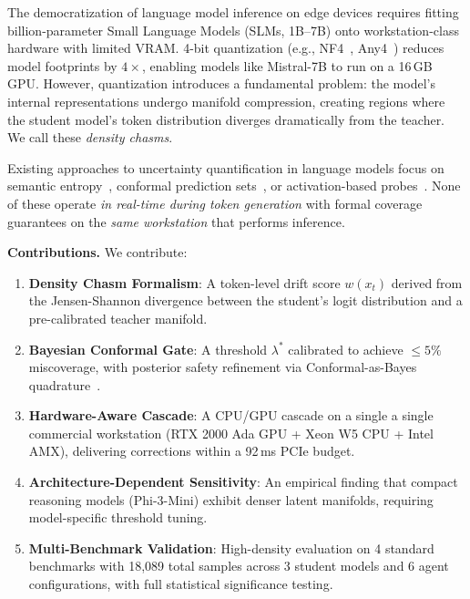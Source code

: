 \documentclass{uai2026}  %
\begin{document}
The democratization of language model inference on edge devices requires fitting
billion-parameter Small Language Models (SLMs, 1B--7B) onto workstation-class hardware with limited VRAM.
4-bit quantization (e.g., NF4~\cite{dettmers2023qlora},
Any4~\cite{dettmers2024any4}) reduces model footprints by $4\times$,
enabling models like Mistral-7B to run on a 16\,GB GPU.
However, quantization introduces a fundamental problem:
the model's internal representations undergo manifold compression,
creating regions where the student model's token distribution diverges
dramatically from the teacher. We call these \emph{density chasms}.

Existing approaches to uncertainty quantification in language models focus on
semantic entropy~\cite{kuhn2023semantic}, conformal prediction
sets~\cite{angelopoulos2022conformal}, or activation-based
probes~\cite{burns2023discovering}.
None of these operate \emph{in real-time during token generation}
with formal coverage guarantees on the \emph{same workstation} that
performs inference.

\textbf{Contributions.} We contribute:
\begin{enumerate}
  \item \textbf{Density Chasm Formalism}: A token-level drift score
    $w(x_t)$ derived from the Jensen-Shannon divergence between the
    student's logit distribution and a pre-calibrated teacher manifold.

  \item \textbf{Bayesian Conformal Gate}: A threshold $\lambda^*$
    calibrated to achieve $\leq 5\%$ miscoverage, with posterior
    safety refinement via Conformal-as-Bayes quadrature~\cite{snell2025conformal}.

  \item \textbf{Hardware-Aware Cascade}: A CPU/GPU cascade on a single
    a single commercial workstation (RTX 2000 Ada GPU + Xeon W5 CPU + Intel AMX),
    delivering corrections within a 92\,ms PCIe budget.

  \item \textbf{Architecture-Dependent Sensitivity}: An empirical finding
    that compact reasoning models (Phi-3-Mini) exhibit denser latent
    manifolds, requiring model-specific threshold tuning.

  \item \textbf{Multi-Benchmark Validation}: High-density evaluation on
    4 standard benchmarks with 18,089 total samples across 3 student
    models and 6 agent configurations, with full statistical significance testing.
\end{enumerate}
\end{document}
